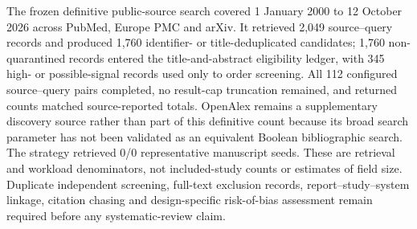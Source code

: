 The frozen definitive public-source search covered 1 January 2000 to 12 October 2026 across PubMed, Europe PMC and arXiv. It retrieved 2,049 source--query records and produced 1,760 identifier- or title-deduplicated candidates; 1,760 non-quarantined records entered the title-and-abstract eligibility ledger, with 345 high- or possible-signal records used only to order screening. All 112 configured source--query pairs completed, no result-cap truncation remained, and returned counts matched source-reported totals. OpenAlex remains a supplementary discovery source rather than part of this definitive count because its broad search parameter has not been validated as an equivalent Boolean bibliographic search. The strategy retrieved 0/0 representative manuscript seeds. These are retrieval and workload denominators, not included-study counts or estimates of field size. Duplicate independent screening, full-text exclusion records, report--study--system linkage, citation chasing and design-specific risk-of-bias assessment remain required before any systematic-review claim.
